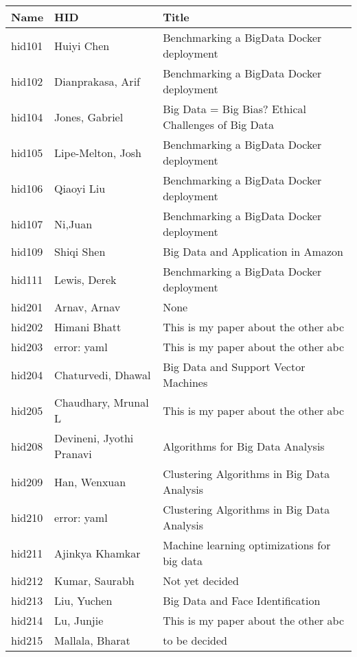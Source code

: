 \documentclass[12pt]{book}
\begin{document}
\begin{footnotesize}
\begin{longtable}{|p{1cm}p{5cm}p{9cm}|}
\hline \textbf{Name} & \textbf{HID} & \textbf{Title} \\ \hline \hline

hid101 & Huiyi Chen & Benchmarking a BigData Docker deployment  \\
\hline
hid102 & Dianprakasa, Arif & Benchmarking a BigData Docker deployment  \\
\hline
hid104 & Jones, Gabriel & Big Data = Big Bias? Ethical Challenges of Big Data  \\
\hline
hid105 & Lipe-Melton, Josh & Benchmarking a BigData Docker deployment  \\
\hline
hid106 & Qiaoyi Liu & Benchmarking a BigData Docker deployment  \\
\hline
hid107 & Ni,Juan & Benchmarking a BigData Docker deployment  \\
\hline
hid109 & Shiqi Shen & Big Data and Application in Amazon  \\
\hline
hid111 & Lewis, Derek & Benchmarking a BigData Docker deployment  \\
\hline
hid201 & Arnav, Arnav & None  \\
\hline
hid202 & Himani Bhatt & This is my paper about the other abc  \\
\hline
hid203 & error: yaml & This is my paper about the other abc  \\
\hline
hid204 & Chaturvedi, Dhawal & Big Data and Support Vector Machines  \\
\hline
hid205 & Chaudhary, Mrunal L & This is my paper about the other abc  \\
\hline
hid208 & Devineni, Jyothi Pranavi & Algorithms for Big Data Analysis  \\
\hline
hid209 & Han, Wenxuan & Clustering Algorithms in Big Data Analysis  \\
\hline
hid210 & error: yaml & Clustering Algorithms in Big Data Analysis  \\
\hline
hid211 & Ajinkya Khamkar & Machine learning optimizations for big data  \\
\hline
hid212 & Kumar, Saurabh & Not yet decided  \\
\hline
hid213 & Liu, Yuchen & Big Data and Face Identification  \\
\hline
hid214 & Lu, Junjie & This is my paper about the other abc  \\
\hline
hid215 & Mallala, Bharat & to be decided  \\

\end{longtable}
\end{footnotesize}
\end{document}
